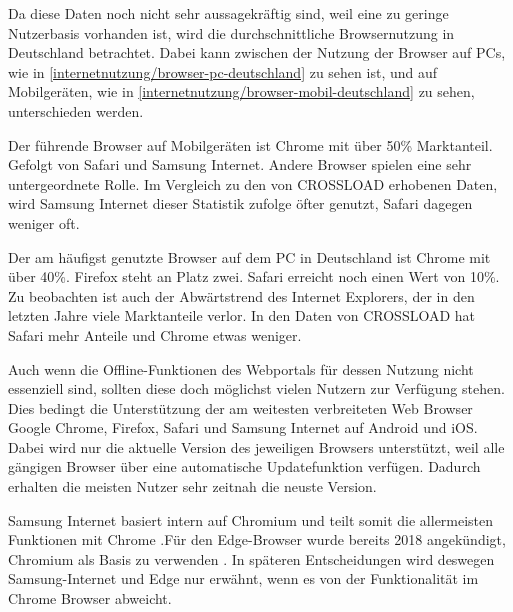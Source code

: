 
Da diese Daten noch nicht sehr aussagekräftig sind, weil eine zu geringe Nutzerbasis vorhanden ist, wird die durchschnittliche Browsernutzung in Deutschland betrachtet. Dabei kann zwischen der Nutzung der Browser auf PCs, wie in \autoref{internetnutzung/browser-pc-deutschland} zu sehen ist, und auf Mobilgeräten, wie in \autoref{internetnutzung/browser-mobil-deutschland} zu sehen, unterschieden werden. 


Der führende Browser auf Mobilgeräten ist Chrome mit über 50\% Marktanteil. Gefolgt von Safari und Samsung Internet. Andere Browser spielen eine sehr untergeordnete Rolle. Im Vergleich zu den von CROSSLOAD erhobenen Daten, wird Samsung Internet dieser Statistik zufolge öfter genutzt, Safari dagegen weniger oft.


Der am häufigst genutzte Browser auf dem PC in Deutschland ist Chrome mit über 40\%. Firefox steht an Platz zwei. Safari erreicht noch einen Wert von 10\%. Zu beobachten ist auch der Abwärtstrend des Internet Explorers, der in den letzten Jahre viele Marktanteile verlor. In den Daten von CROSSLOAD hat Safari mehr Anteile und Chrome etwas weniger.

Auch wenn die Offline-Funktionen des Webportals für dessen Nutzung nicht essenziell sind, sollten diese doch möglichst vielen Nutzern zur Verfügung stehen. Dies bedingt die Unterstützung der am weitesten verbreiteten Web Browser Google Chrome, Firefox, Safari und Samsung Internet auf Android und iOS. Dabei wird nur die aktuelle Version des jeweiligen Browsers unterstützt, weil alle gängigen Browser über eine automatische Updatefunktion verfügen. Dadurch erhalten die meisten Nutzer sehr zeitnah die neuste Version.

Samsung Internet basiert intern auf Chromium und teilt somit die allermeisten Funktionen mit Chrome \autocite{samsung-webkit}.Für den Edge-Browser wurde bereits 2018 angekündigt, Chromium als Basis zu verwenden \autocite{edge-faq}. In späteren Entscheidungen wird deswegen Samsung-Internet und Edge nur erwähnt, wenn es von der Funktionalität im Chrome Browser abweicht.

